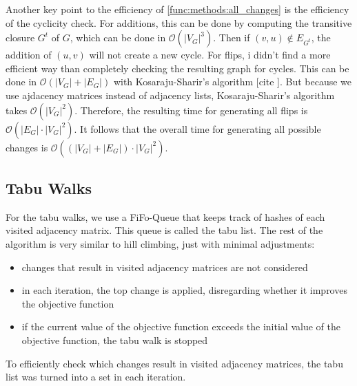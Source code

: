 \documentclass[sigconf, fleqn, prologue, dvipsnames]{acmart}
\newcommand{\abs}[1]{\left\vert #1 \right\vert}
\def\O{\mathcal{O}}
\def\ndy{%
    \reversemarginpar%
    \marginpar{\raggedleft\textcolor{red}{\rule{2mm}{2mm}}}%
}
\begin{document}
Another key point to the efficiency of \autoref{func:methods:all_changes} is the efficiency of the cyclicity check.
For additions, this can be done by computing the transitive closure $G^t$ of $G$, which can be done in $\O(\abs{V_G}^3)$.
Then if $(v, u) \notin E_{G^t}$, the addition of $(u,v)$ will not create a new cycle.
For flips, i didn't find a more efficient way than completely checking the resulting graph for cycles.
This can be done in $\O(\abs{V_G} + \abs{E_G})$ with Kosaraju-Sharir's algorithm [cite\ndy].
But because we use ajdacency matrices instead of adjacency lists, Kosaraju-Sharir's algorithm takes $\O(\abs{V_G}^2)$.
Therefore, the resulting time for generating all flips is $\O(\abs{E_G} \cdot \abs{V_G}^2)$.
It follows that the overall time for generating all possible changes is $\O((\abs{V_G} + \abs{E_G}) \cdot \abs{V_G}^2)$.

\FloatBarrier


\subsection{Tabu Walks}
For the tabu walks, we use a FiFo-Queue that keeps track of hashes of each visited adjacency matrix. This queue is called the tabu list.
The rest of the algorithm is very similar to hill climbing, just with minimal adjustments:
\begin{itemize}
	\item changes that result in visited adjacency matrices are not considered
	\item in each iteration, the top change is applied, disregarding whether it improves the objective function
	\item if the current value of the objective function exceeds the initial value of the objective function, the tabu walk is stopped
\end{itemize}
To efficiently check which changes result in visited adjacency matrices, the tabu list was turned into a set in each iteration.
\end{document}

